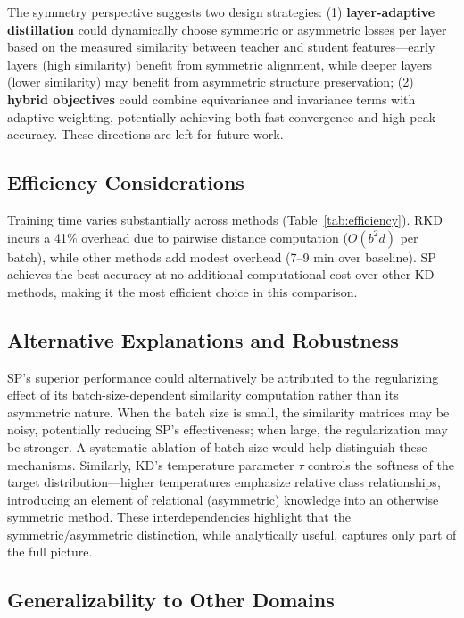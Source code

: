 \documentclass[symmetry,article,submit,pdftex,moreauthors]{Definitions/mdpi}
\begin{document}
The symmetry perspective suggests two design strategies: (1) \textbf{layer-adaptive distillation} could dynamically choose symmetric or asymmetric losses per layer based on the measured similarity between teacher and student features---early layers (high similarity) benefit from symmetric alignment, while deeper layers (lower similarity) may benefit from asymmetric structure preservation; (2) \textbf{hybrid objectives} could combine equivariance and invariance terms with adaptive weighting, potentially achieving both fast convergence and high peak accuracy. These directions are left for future work.

\subsection{Efficiency Considerations}

Training time varies substantially across methods (Table~\ref{tab:efficiency}). RKD incurs a 41\% overhead due to pairwise distance computation ($O(b^2 d)$ per batch), while other methods add modest overhead (7--9 min over baseline). SP achieves the best accuracy at no additional computational cost over other KD methods, making it the most efficient choice in this comparison.

\subsection{Alternative Explanations and Robustness}

SP's superior performance could alternatively be attributed to the regularizing effect of its batch-size-dependent similarity computation rather than its asymmetric nature. When the batch size is small, the similarity matrices may be noisy, potentially reducing SP's effectiveness; when large, the regularization may be stronger. A systematic ablation of batch size would help distinguish these mechanisms. Similarly, KD's temperature parameter $\tau$ controls the softness of the target distribution---higher temperatures emphasize relative class relationships, introducing an element of relational (asymmetric) knowledge into an otherwise symmetric method. These interdependencies highlight that the symmetric/asymmetric distinction, while analytically useful, captures only part of the full picture.

\subsection{Generalizability to Other Domains}
\end{document}
